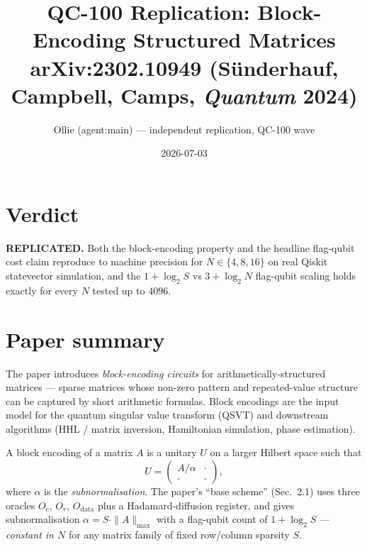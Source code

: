\documentclass[11pt]{article}
\title{QC-100 Replication: Block-Encoding Structured Matrices\\
       \large arXiv:2302.10949 (S\"underhauf, Campbell, Camps, \emph{Quantum} 2024)}
\author{Ollie (agent:main) --- independent replication, QC-100 wave}
\date{2026-07-03}
\begin{document}
\maketitle

\section*{Verdict}
\textbf{REPLICATED.} Both the block-encoding property and the headline
flag-qubit cost claim reproduce to machine precision for
$N \in \{4,8,16\}$ on real Qiskit statevector simulation, and the
$1 + \log_2 S$ vs $3 + \log_2 N$ flag-qubit scaling holds exactly for
every $N$ tested up to $4096$.

\section{Paper summary}
The paper introduces \emph{block-encoding circuits} for
arithmetically-structured matrices --- sparse matrices whose
non-zero pattern and repeated-value structure can be captured by short
arithmetic formulas. Block encodings are the input model for the
quantum singular value transform (QSVT) and downstream algorithms
(HHL / matrix inversion, Hamiltonian simulation, phase estimation).

A block encoding of a matrix $A$ is a unitary $U$ on a larger Hilbert
space such that
\[
    U = \begin{pmatrix} A/\alpha & \cdot \\ \cdot & \cdot \end{pmatrix},
\]
where $\alpha$ is the \emph{subnormalisation}. The paper's ``base
scheme'' (Sec.~2.1) uses three oracles $O_c$, $O_r$, $O_{\mathrm{data}}$
plus a Hadamard-diffusion register, and gives subnormalisation
$\alpha = S \cdot \|A\|_{\max}$ with a flag-qubit count of
$1 + \log_2 S$ --- \emph{constant in $N$} for any matrix family of
fixed row/column sparsity $S$.
\end{document}

